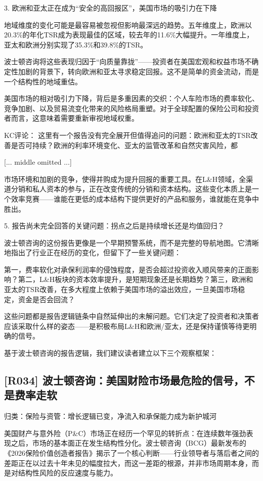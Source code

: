 \documentclass[11pt]{ctexart}
\begin{document}
3. 欧洲和亚太正在成为“安全的高回报区”，美国市场的吸引力在下降

地域维度的变化可能是最容易被忽视但影响最深远的趋势。五年维度上，欧洲以20.3\%的年化TSR成为表现最佳的区域，较去年的11.6\%大幅提升。一年维度上，亚太和欧洲分别实现了35.3\%和39.8\%的TSR。

波士顿咨询将这些表现归因于“向质量靠拢”——投资者在美国宏观和权益市场不确定性加剧的背景下，转向欧洲和亚太寻求稳定回报。这不是简单的资金流动，而是一个结构性的地域重估。

美国市场的相对吸引力下降，背后是多重因素的交织：个人车险市场的费率软化、竞争加剧、以及贸易流变化带来的风险格局重塑。对于全球配置的保险公司和投资者而言，这意味着需要重新审视地域权重。

KC评论： 这里有一个报告没有完全展开但值得追问的问题：欧洲和亚太的TSR改善是否可持续？欧洲的利率环境变化、亚太的监管改革和自然灾害风险，都

[... middle omitted ...]

市场环境和加剧的竞争，使得并购成为提升回报的重要工具。在L\&H领域，全渠道分销和私人资本的参与，正在改变传统的分销和资本结构。这些变化本质上是一个效率竞赛——谁能在更低的成本结构下提供更好的产品和服务，谁就能在竞争中胜出。

5. 报告尚未完全回答的关键问题：拐点之后是持续增长还是均值回归？

波士顿咨询的这份报告更像是一个早期预警系统，而不是完整的导航地图。它清晰地指出了行业正在经历的变化，但留下了一些关键问题：

第一，费率软化对承保利润率的侵蚀程度，是否会超过投资收入顺风带来的正面影响？第二，L\&H板块的资本效率提升，是短期现象还是长期趋势？第三，欧洲和亚太的TSR改善，在多大程度上依赖于美国市场的溢出效应，一旦美国市场稳定，资金是否会回流？

这些问题都是报告逻辑链条中自然延伸出的未解问题。它们决定了投资者和决策者应该采取什么样的姿态——是积极布局L\&H和欧洲/亚太，还是保持谨慎等待更明确的信号。

基于波士顿咨询的报告逻辑，我们建议读者建立以下三个观察框架：

\subsection{[R034] 波士顿咨询：美国财险市场最危险的信号，不是费率走软}
{\small\color{refgray}归类：保险与资管：增长逻辑已变，净流入和承保能力成为新护城河}

美国财产与意外险（P\&C）市场正在经历一个罕见的转折点：在连续数年强劲表现之后，市场的基本面正在发生结构性分化。波士顿咨询（BCG）最新发布的《2026保险价值创造者报告》揭示了一个核心判断——行业领导者与落后者之间的差距正在以过去十年未见的幅度拉大，而这一差距的根源，并非市场周期本身，而是对结构性风险的反应速度与能力。
\end{document}
